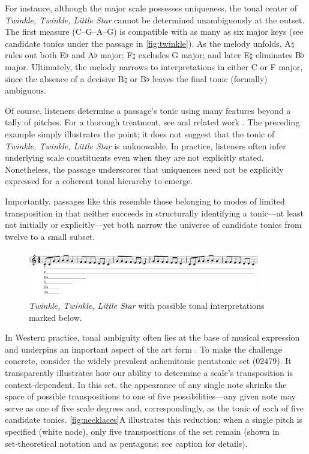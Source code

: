 \documentclass[10pt,twocolumn]{article}
\numberwithin{equation}{section} %
\begin{document}
    For instance, although the major scale possesses uniqueness, the tonal center of \emph{Twinkle, Twinkle, Little Star} cannot be determined unambiguously at the outset.
    The first measure (C–G–A–G) is compatible with as many as six major keys (see candidate tonics under the passage in \autoref{fig:twinkle}).
    As the melody unfolds, A$\natural$ rules out both E$\flat$ and A$\flat$ major; F$\natural$ excludes G major; and later E$\natural$ eliminates B$\flat$ major.
    Ultimately, the melody narrows to interpretations in either C or F major, since the absence of a decisive B$\natural$ or B$\flat$ leaves the final tonic (formally) ambiguous.

    Of course, listeners determine a passage’s tonic using many features beyond a tally of pitches.
    For a thorough treatment, see \citet{LerdahlJackendoff1983} and related work \citep{BharuchaKrumhansl1983,Lerdahl2004,Patel1998,Thompson1997}.
    The preceding example simply illustrates the point; it does not suggest that the tonic of \emph{Twinkle, Twinkle, Little Star} is unknowable.
    In practice, listeners often infer underlying scale constituents even when they are not explicitly stated.
    Nonetheless, the passage underscores that uniqueness need not be explicitly expressed for a coherent tonal hierarchy to emerge.

    Importantly, passages like this resemble those belonging to modes of limited transposition in that neither succeeds in structurally identifying a tonic—at least not initially or explicitly—yet both narrow the universe of candidate tonics from twelve to a small subset.

    \begin{figure}[htbp]
        \centering
        \includegraphics[width=0.9\textwidth]{figures/twinkle}%
        \caption{\emph{Twinkle, Twinkle, Little Star} with possible tonal interpretations marked below.}
        \label{fig:twinkle}
    \end{figure}

    In Western practice, tonal ambiguity often lies at the base of musical expression and underpins an important aspect of the art form \citep{NodenSkinner1984, Richards2017, Smith1992, Temperley2007, Uchida1990}.
    To make the challenge concrete, consider the widely prevalent anhemitonic pentatonic set (02479).
    It transparently illustrates how our ability to determine a scale’s transposition is context‑dependent.
    In this set, the appearance of any single note shrinks the space of possible transpositions to one of five possibilities—any given note may serve as one of five scale degrees and, correspondingly, as the tonic of each of five candidate tonics.
    \autoref{fig:necklaces}A illustrates this reduction: when a single pitch is specified (white node), only five transpositions of the set remain (shown in set‑theoretical notation and as pentagons; see caption for details).
\end{document}
